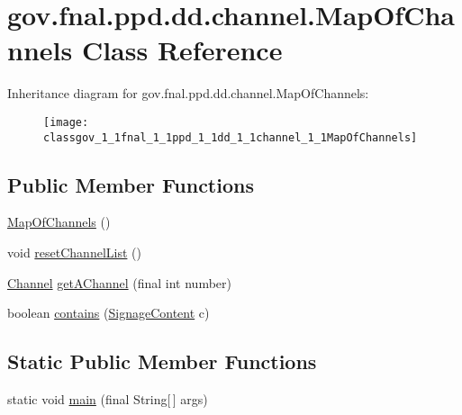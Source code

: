 \hypertarget{classgov_1_1fnal_1_1ppd_1_1dd_1_1channel_1_1MapOfChannels}{\section{gov.\-fnal.\-ppd.\-dd.\-channel.\-Map\-Of\-Channels Class Reference}
\label{classgov_1_1fnal_1_1ppd_1_1dd_1_1channel_1_1MapOfChannels}
}
Inheritance diagram for gov.\-fnal.\-ppd.\-dd.\-channel.\-Map\-Of\-Channels\-:\begin{figure}[H]
\begin{center}
\leavevmode
\texttt{[image: classgov\_1\_1fnal\_1\_1ppd\_1\_1dd\_1\_1channel\_1\_1MapOfChannels]}
\end{center}
\end{figure}
\subsection*{Public Member Functions}
\begin{DoxyCompactItemize}
\item 
\hyperlink{classgov_1_1fnal_1_1ppd_1_1dd_1_1channel_1_1MapOfChannels_a50904afe8dc2195a5bdc156efc32e065}{Map\-Of\-Channels} ()
\item 
void \hyperlink{classgov_1_1fnal_1_1ppd_1_1dd_1_1channel_1_1MapOfChannels_a2631777fd0adabe06c3c3941190e4e0b}{reset\-Channel\-List} ()
\item 
\hyperlink{interfacegov_1_1fnal_1_1ppd_1_1dd_1_1signage_1_1Channel}{Channel} \hyperlink{classgov_1_1fnal_1_1ppd_1_1dd_1_1channel_1_1MapOfChannels_a1fe019368302baecc21d10cf1def241a}{get\-A\-Channel} (final int number)
\item 
boolean \hyperlink{classgov_1_1fnal_1_1ppd_1_1dd_1_1channel_1_1MapOfChannels_abc6f10d676361ad8d26cb8e6a581cc31}{contains} (\hyperlink{interfacegov_1_1fnal_1_1ppd_1_1dd_1_1signage_1_1SignageContent}{Signage\-Content} c)
\end{DoxyCompactItemize}
\subsection*{Static Public Member Functions}
\begin{DoxyCompactItemize}
\item 
static void \hyperlink{classgov_1_1fnal_1_1ppd_1_1dd_1_1channel_1_1MapOfChannels_a2e3cd81fac45f2de2333d26dc534b699}{main} (final String\mbox{[}$\,$\mbox{]} args)
\end{DoxyCompactItemize}


